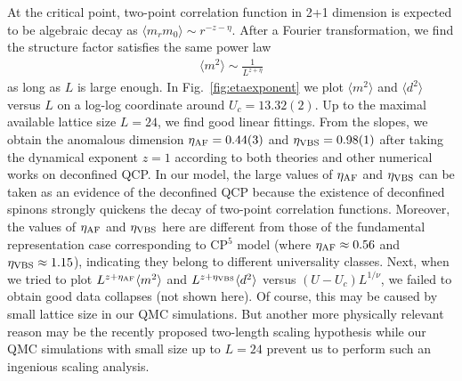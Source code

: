 \documentclass[twocolumn,superscriptaddress]{revtex4-1}
\begin{document}

At the critical point, two-point correlation function in 2+1 dimension is expected to be algebraic decay as $\langle m_rm_0\rangle\sim r^{-z-\eta}$. \cite{Sondhi1997} After a Fourier transformation, we find the structure factor satisfies the same power law
\begin{eqnarray}
  \langle m^2 \rangle \sim \frac{1}{L^{z+\eta}}
\end{eqnarray}
as long as $L$ is large enough.
In Fig.~\ref{fig:etaexponent} we plot $\langle m^2 \rangle$ and $\langle d^2\rangle$ versus $L$ on a log-log coordinate around $U_c=13.32(2)$. Up to the maximal available lattice size $L=24$, we find good linear fittings. From the slopes, we obtain the anomalous dimension $\eta_{\rm AF}=0.44(3)$ and $\eta_{\rm VBS}=0.98(1)$ after taking the dynamical exponent $z=1$ according to both theories and other numerical works on deconfined QCP. \cite{Senthil2004,*Senthil2004a,*Levin2004,Sandvik2007} 
In our model, the large values of $\eta_{\rm AF}$ and $\eta_{\rm VBS}$ can be taken as an evidence of the deconfined QCP because the existence of deconfined spinons strongly quickens the decay of two-point correlation functions. Moreover, the values of $\eta_{\rm AF}$ and $\eta_{\rm VBS}$ here are different from those of the fundamental representation case corresponding to CP$^{5}$ model (where $\eta_{\rm AF}\approx0.56$ and $\eta_{\rm VBS}\approx1.15$), \cite{Kaul2012a} indicating they belong to different universality classes.
Next, when we tried to plot $L^{z+\eta_{\rm AF}}\langle m^2 \rangle$ and $L^{z+\eta_{\rm VBS}}\langle d^2 \rangle$ versus $(U-U_c)L^{1/\nu}$, we failed to obtain good data collapses (not shown here). Of course, this may be caused by small lattice size in our QMC simulations. But another more physically relevant reason may be the recently proposed two-length scaling hypothesis \cite{Senthil2004,Shao2016} while our QMC simulations with small size up to $L=24$ prevent us to perform such an ingenious scaling analysis.
\end{document}
